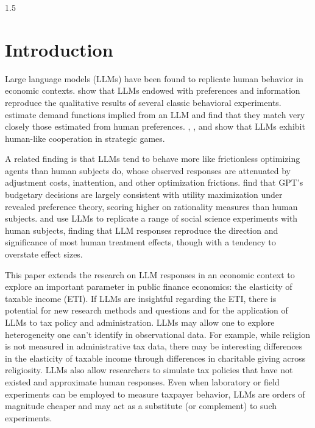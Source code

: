 \documentclass[letterpaper,9pt]{article}
\theoremstyle{definition}
\begin{document}
\begin{spacing}{1.5}


\section{Introduction}
Large language models (LLMs) have been found to replicate human behavior in economic contexts. \cite{horton2023large} show that LLMs endowed with preferences and information reproduce the qualitative results of several classic behavioral experiments. \cite{BIN2023} estimate demand functions implied from an LLM and find that they match very closely those estimated from human preferences. \cite{BrookinsDeBacker2024}, \cite{mei2024turing}, and \cite{akata2025playing} show that LLMs exhibit human-like cooperation in strategic games.

A related finding is that LLMs tend to behave more like frictionless optimizing agents than human subjects do, whose observed responses are attenuated by adjustment costs, inattention, and other optimization frictions. \cite{chen2023emergence} find that GPT's budgetary decisions are largely consistent with utility maximization under revealed preference theory, scoring higher on rationality measures than human subjects. \cite{AHGW2024} and \cite{cui2025large} use LLMs to replicate a range of social science experiments with human subjects, finding that LLM responses reproduce the direction and significance of most human treatment effects, though with a tendency to overstate effect sizes.

This paper extends the research on LLM responses in an economic context to explore an important parameter in public finance economics: the elasticity of taxable income (ETI).  If LLMs are insightful regarding the ETI, there is potential for new research methods and questions and for the application of LLMs to tax policy and administration. LLMs may allow one to explore heterogeneity one can't identify in observational data. For example, while religion is not measured in administrative tax data, there may be interesting differences in the elasticity of taxable income through differences in charitable giving across religiosity. LLMs also allow researchers to simulate tax policies that have not existed and approximate human responses. Even when laboratory or field experiments can be employed to measure taxpayer behavior, LLMs are orders of magnitude cheaper and may act as a substitute (or complement) to such experiments.


\end{spacing}
\end{document}
